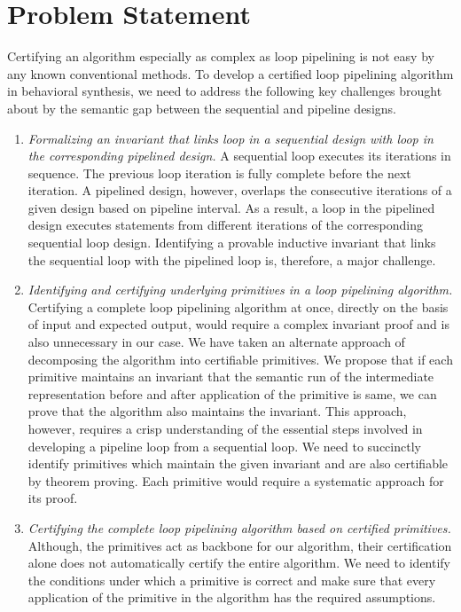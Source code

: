 \section{Problem Statement}
Certifying an algorithm especially as complex as loop pipelining is
not easy by any known conventional methods.
To develop a certified loop pipelining algorithm in behavioral synthesis,
we need to address the following key challenges brought about by the semantic
gap between the sequential and pipeline designs.
\begin{enumerate}[--]
\item {\em Formalizing an invariant that links loop in a sequential design
with loop in the corresponding pipelined design.} A sequential loop executes its iterations in sequence. The previous loop iteration is fully complete before the next iteration. A pipelined design, however, overlaps the consecutive iterations of a given design based on pipeline interval. As a result, a loop in the pipelined design executes statements from different iterations of the corresponding sequential loop design. Identifying a provable inductive invariant that links the sequential loop with the pipelined loop is, therefore, a major challenge.
\item {\em Identifying and certifying underlying primitives in a loop pipelining algorithm.} Certifying a complete loop pipelining algorithm at once, directly on the basis of input and expected output, would require a complex invariant proof and is also unnecessary in our case. We have taken an alternate approach of decomposing the algorithm into certifiable primitives.
We propose that if each primitive maintains an invariant that the semantic run of the intermediate representation before and after application of the primitive is same, we can prove that the algorithm also maintains the invariant. This approach, however, requires a crisp understanding of the essential steps involved in developing a pipeline loop from a sequential loop. We need to succinctly identify primitives which maintain the given invariant and are also certifiable by theorem proving. Each primitive would require a systematic approach for its proof.
\item {\em Certifying the complete loop pipelining algorithm based on certified primitives.} Although, the primitives act as backbone for our algorithm, their certification alone does not automatically certify the entire algorithm. We need to identify the conditions under which a primitive is correct and make sure that every application of the primitive in the algorithm has the required assumptions.
\end{enumerate}

